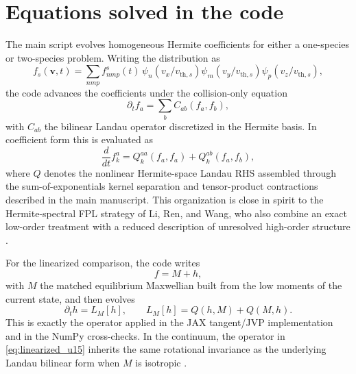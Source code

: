 \documentclass[11pt]{article}
\begin{document}
\section{Equations solved in the code}
The main script evolves homogeneous Hermite coefficients for either a one-species or two-species problem.
Writing the distribution as
\begin{equation}
f_s(\mathbf v,t)=\sum_{nmp} f^s_{nmp}(t)\,\psi_n(v_x/v_{\mathrm{th},s})\psi_m(v_y/v_{\mathrm{th},s})\psi_p(v_z/v_{\mathrm{th},s}),
\end{equation}
the code advances the coefficients under the collision-only equation
\begin{equation}
\partial_t f_a = \sum_b C_{ab}(f_a,f_b),
\end{equation}
with $C_{ab}$ the bilinear Landau operator discretized in the Hermite basis.
In coefficient form this is evaluated as
\begin{equation}
\frac{d}{dt} f^a_k = Q^{aa}_k(f_a,f_a) + Q^{ab}_k(f_a,f_b),
\end{equation}
where $Q$ denotes the nonlinear Hermite-space Landau RHS assembled through the sum-of-exponentials kernel separation and tensor-product contractions described in the main manuscript.
This organization is close in spirit to the Hermite-spectral FPL strategy of Li, Ren, and Wang, who also combine an exact low-order treatment with a reduced description of unresolved high-order structure \cite{li2021hermite}.

For the linearized comparison, the code writes
\begin{equation}
f = M + h,
\end{equation}
with $M$ the matched equilibrium Maxwellian built from the low moments of the current state, and then evolves
\begin{equation}
\partial_t h = L_M[h],\qquad
L_M[h] = Q(h,M) + Q(M,h).
\label{eq:linearized_u15}
\end{equation}
This is exactly the operator applied in the JAX tangent/JVP implementation and in the NumPy cross-checks.
In the continuum, the operator in \cref{eq:linearized_u15} inherits the same rotational invariance as the underlying Landau bilinear form when $M$ is isotropic \cite{madsen2013linearized,pan2020exact}.
\end{document}
